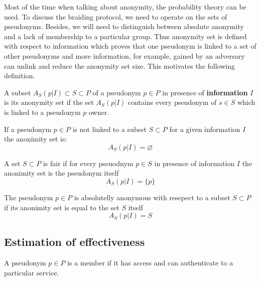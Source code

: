 \documentclass[12pt]{article}
\newenvironment{corollary}[2][Corollary]{\begin{trivlist}
\item[\hskip \labelsep {\bfseries #1}\hskip \labelsep {\bfseries #2.}]}{\end{trivlist}}
\newenvironment{definition}[2][Definition]{\begin{trivlist}
\item[\hskip \labelsep {\bfseries #1}\hskip \labelsep {\bfseries #2.}]}{\end{trivlist}}
\begin{document}
Most of the time when talking about anonymity, the probability theory can be used. To discuss the braiding protocol, we need to operate on the sets of pseudonyms. Besides, we will need to distinguish between absolute anonymity and a lack of membership to a particular group. Thus anonymity set is defined with respect to information which proves that one pseudonym is linked to a set of other pseudonyms and more information, for example, gained by an adversary can unlink and reduce the anonymity set size. This motivates the following definition.
\begin{definition}{(anonymity set)}
  A subset $A_S(p | I) \subset S \subset P$ of a pseudonym $p \in P$ in presence of {\bf information} $I$ is its anonymity set if the set $A_S(p | I)$ contains every pseudonym of $s \in S$ which is linked to a pseudonym $p$ owner.
\end{definition}


\begin{corollary}{I}
  If a pseudonym $p \in P$ is not linked to a subset $S \subset P$ for a given information $I$ the anonimity set is:
  \begin{equation}
    A_S(p | I) = \varnothing
  \end{equation}
\end{corollary}

\begin{definition}{(fairness)}
  A set $S \subset P$ is fair if for every pseuodnym $p \in S$ in presence of information $I$ the anonimity set is the pseudonym itself
  \begin{equation}
    A_S(p | I) = \{p\}
  \end{equation}
\end{definition}

\begin{definition}{(absolute anonimity)}
  The pseudonym $p \in P$ is absolutelly anonymous with resepect to a subset $S \subset P$ if its anonimity set is equal to the set $S$ itself
  \begin{equation}
    A_S(p|I) = S
  \end{equation}
\end{definition}

\subsection*{Estimation of effectiveness}

\begin{definition}{(member)}
  A pseudonym $p \in P$ is a member if it has access and can authenticate to a particular service.
\end{definition}
\end{document}
